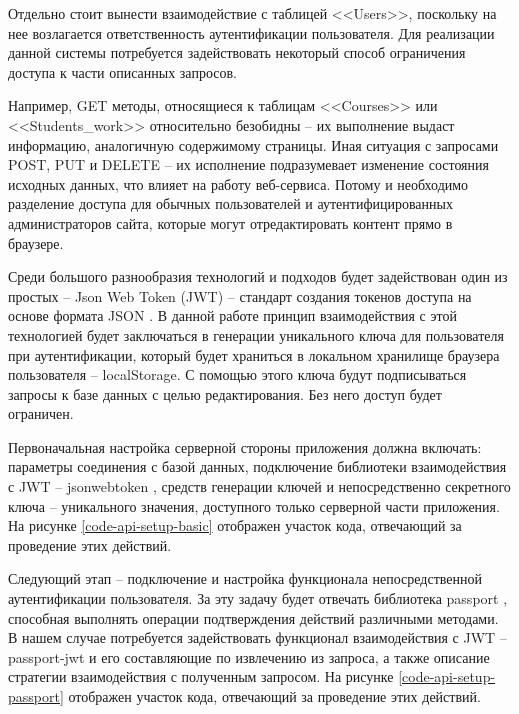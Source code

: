 Отдельно стоит вынести взаимодействие с таблицей <<Users>>, поскольку на нее возлагается ответственность аутентификации пользователя.
Для реализации данной системы потребуется задействовать некоторый способ ограничения доступа к части описанных запросов.

Например, GET методы, относящиеся к таблицам <<Courses>> или <<Students\_work>> относительно безобидны -- их выполнение выдаст информацию, аналогичную содержимому страницы.
Иная ситуация с запросами POST, PUT и DELETE -- их исполнение подразумевает изменение состояния исходных данных, что влияет на работу веб-сервиса.
Потому и необходимо разделение доступа для обычных пользователей и аутентифицированных администраторов сайта, которые могут отредактировать контент прямо в браузере.

Среди большого разнообразия технологий и подходов будет задействован один из простых -- Json Web Token (JWT) \cite{jwt} -- стандарт создания токенов доступа на основе формата JSON \cite{wiki-json}. 
В данной работе принцип взаимодействия с этой технологией будет заключаться в генерации уникального ключа для пользователя при аутентификации, который будет храниться в локальном хранилище браузера пользователя -- localStorage.
С помощью этого ключа будут подписываться запросы к базе данных с целью редактирования.
Без него доступ будет ограничен.

Первоначальная настройка серверной стороны приложения должна включать: параметры соединения с базой данных, подключение библиотеки взаимодействия с JWT -- jsonwebtoken  \cite{npm-jsonwebtoken}, средств генерации ключей и непосредственно секретного ключа -- уникального значения, доступного только серверной части приложения.
На рисунке \ref{code-api-setup-basic} отображен участок кода, отвечающий за проведение этих действий.


Следующий этап -- подключение и настройка функционала непосредственной аутентификации пользователя.
За эту задачу будет отвечать библиотека passport \cite{npm-passport}, способная выполнять операции подтверждения действий различными методами.
В нашем случае потребуется задействовать функционал взаимодействия с JWT -- passport-jwt и его составляющие по извлечению из запроса, а также описание стратегии взаимодействия с полученным запросом.
На рисунке \ref{code-api-setup-passport} отображен участок кода, отвечающий за проведение этих действий.

